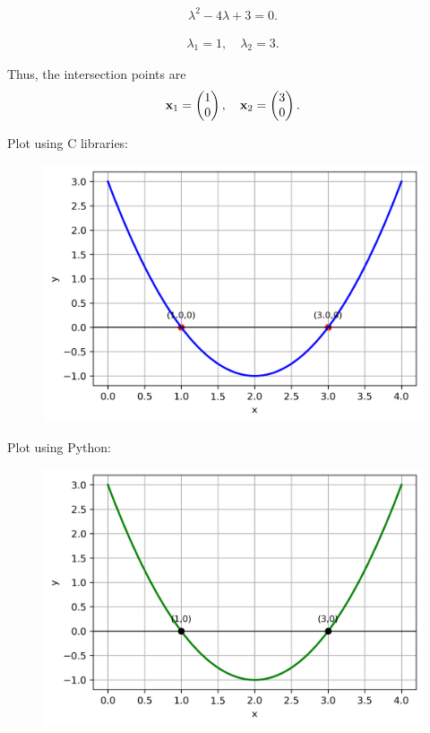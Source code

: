 \documentclass{beamer}
\numberwithin{equation}{section}
\begin{document}
\begin{align}
    \lambda^2 - 4\lambda + 3 = 0.
\end{align}

\begin{align}
    \lambda_1 = 1, \quad \lambda_2 = 3.
\end{align}

Thus, the intersection points are
\begin{align}
    \mathbf{x}_1 = \begin{pmatrix}1 \\ 0\end{pmatrix}, \quad 
    \mathbf{x}_2 = \begin{pmatrix}3 \\ 0\end{pmatrix}.
\end{align}
\begin{frame}
Plot using C libraries:
\begin{figure}[H]
	\centering
	\includegraphics[scale=0.5]{img1}
	\caption*{}
	\label{img1}
\end{figure}
\end{frame}
\begin{frame}
Plot using Python:
\begin{figure}[H]
	\centering
	\includegraphics[scale=0.5]{img2}
	\caption*{}
	\label{img2}
\end{figure}
\end{frame}
\end{document}
